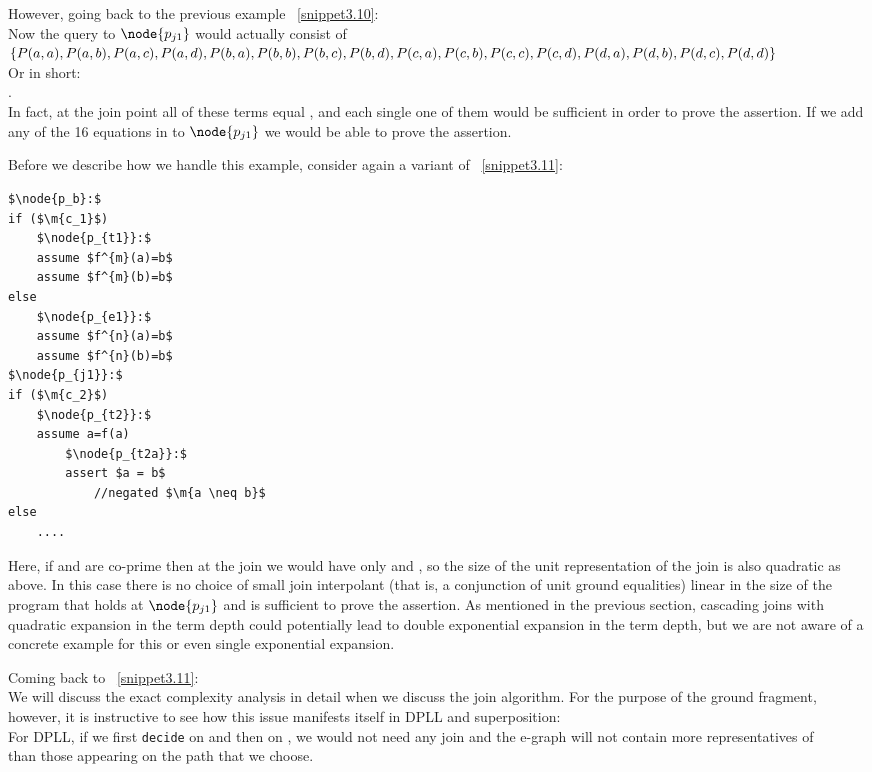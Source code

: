 However, going back to the previous example ~\ref{snippet3.10}:\\
Now the query to $\node{p_{j1}}$ would actually consist of \\
$\{P(a,a),P(a,b),P(a,c),P(a,d),P(b,a),P(b,b),P(b,c),P(b,d), \\
P(c,a),P(c,b),P(c,c),P(c,d),P(d,a),P(d,b),P(d,c),P(d,d)\}$ \\
Or in short: \\
. \\
In fact, at the join point all of these terms equal , and each single one of them would be sufficient in order to prove the assertion.
If we add any of the 16 equations in  to $\node{p_{j1}}$ we would be able to prove the assertion.

Before we describe how we handle this example, consider again a variant of ~\ref{snippet3.11}:
\begin{lstlisting}[caption=join congruence closure quadratic branch,label=snippet3.27]
$\node{p_b}:$
if ($\m{c_1}$)
	$\node{p_{t1}}:$
	assume $f^{m}(a)=b$
	assume $f^{m}(b)=b$
else
	$\node{p_{e1}}:$
	assume $f^{n}(a)=b$
	assume $f^{n}(b)=b$
$\node{p_{j1}}:$
if ($\m{c_2}$)
	$\node{p_{t2}}:$
	assume a=f(a)
		$\node{p_{t2a}}:$
		assert $a = b$
			//negated $\m{a \neq b}$
else
	....
\end{lstlisting}
Here, if  and  are co-prime then at the join we would have only  and , 
so the size of the unit representation of the join is also quadratic as above.
In this case there is no choice of small join interpolant (that is, a conjunction of unit ground equalities)  linear in the size of the program that holds at $\node{p_{j1}}$ and is sufficient to prove the assertion.
As mentioned in the previous section, cascading joins with quadratic expansion in the term depth could potentially lead to double exponential expansion in the term depth, but we are not aware of a concrete example for this or even single exponential expansion.

Coming back to ~\ref{snippet3.11}:\\
We will discuss the exact complexity analysis in detail when we discuss the join algorithm.
For the purpose of the ground fragment, however, it is instructive to see how this issue manifests itself in DPLL and superposition:\\
For DPLL, if we first \lstinline{decide} on  and then on , we would not need any join and the e-graph 
will not contain more representatives of \\
 than those appearing on the path that we choose.

